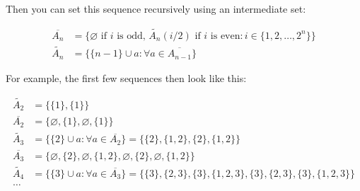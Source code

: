 \documentclass[a4paper, openany, 12pt]{article}
\theoremstyle{remark}
\theoremstyle{definition}
\begin{document}
Then you can set this sequence recursively using an intermediate set:

\begin{align}
    \overline{A_n} &= \{\varnothing \text{ if $i$ is odd, } \widetilde{A_n}(i/2) \text{ if $i$ is even} : i\in \{1,2,\dots,2^{n}\}\}    \\
    \widetilde{A_n} &= \{\{n-1\}\cup a: \forall a \in \overline{A_{n-1}}\}
\end{align}

For example, the first few sequences then look like this:

\begin{align}
    \widetilde{A_2} &= \{\{1\},\{1\}\}\\
    \overline{A_2} &= \{\varnothing, \{1\},\varnothing, \{1\}\}\\
    \widetilde{A_3} &= \{\{2\}\cup a: \forall a \in \overline{A_2}\} = \{\{2\},\{1,2\},\{2\},\{1,2\}\} \\
    \overline{A_3} &= \{\varnothing,\{2\},\varnothing,\{1,2\},\varnothing,\{2\},\varnothing,\{1,2\}\} \\
    \widetilde{A_4} &= \{\{3\}\cup a: \forall a \in \overline{A_3}\} = \{\{3\},\{2,3\},\{3\},\{1,2,3\},\{3\},\{2,3\},\{3\},\{1,2,3\}\} \\
    \dots
\end{align}
\end{document}
